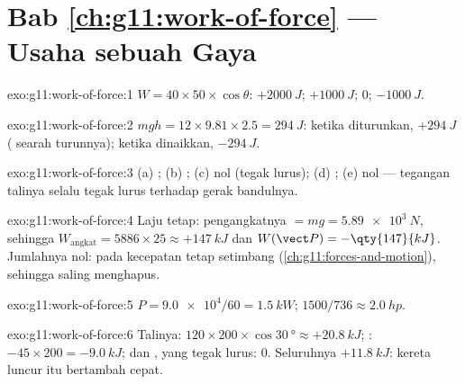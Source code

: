 \section*{Bab \ref{ch:g11:work-of-force} --- Usaha sebuah Gaya}

\begin{solution}{exo:g11:work-of-force:1}
$W = 40 \times 50 \times \cos\theta$: $+\qty{2000}{J}$;
$+\qty{1000}{J}$; $0$; $-\qty{1000}{J}$.
\end{solution}

\begin{solution}{exo:g11:work-of-force:2}
$mgh = 12 \times 9.81 \times 2.5 = \qty{294}{J}$: ketika diturunkan,
$+\qty{294}{J}$ ( searah turunnya); ketika dinaikkan,
$-\qty{294}{J}$.
\end{solution}

\begin{solution}{exo:g11:work-of-force:3}
(a) ; (b) ; (c) nol (tegak lurus); (d) ;
(e) nol --- tegangan talinya selalu tegak lurus terhadap gerak
bandulnya.
\end{solution}

\begin{solution}{exo:g11:work-of-force:4}
Laju tetap:  pengangkatnya $= mg = \qty{5.89e3}{N}$, sehingga
$W_{\text{angkat}} = 5886 \times 25 \approx +\qty{147}{kJ}$ dan
$W(\vect P) = -\qty{147}{kJ}$. Jumlahnya nol: pada kecepatan tetap
 setimbang (\cref{ch:g11:forces-and-motion}), sehingga 
saling menghapus.
\end{solution}

\begin{solution}{exo:g11:work-of-force:5}
$P = \num{9.0e4}/60 = \qty{1.5}{kW}$; $1500/736 \approx \qty{2.0}{hp}$.
\end{solution}

\begin{solution}{exo:g11:work-of-force:6}
Talinya: $120 \times 200 \times \cos\qty{30}{\degree} \approx
+\qty{20.8}{kJ}$; : $-45 \times 200 = -\qty{9.0}{kJ}$; 
dan , yang tegak lurus: $0$. Seluruhnya
$+\qty{11.8}{kJ}$: kereta luncur itu bertambah cepat.
\end{solution}

